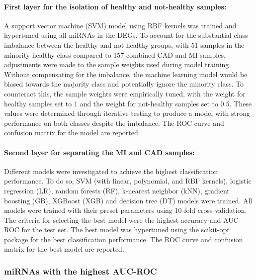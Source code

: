 \documentclass[sn-mathphys,Numbered]{sn-jnl}%
\theoremstyle{thmstyleone}%
\theoremstyle{thmstyletwo}%
\theoremstyle{thmstylethree}%
\begin{document}
\paragraph{First layer for the isolation of healthy and not-healthy
samples:}\label{first-layer-for-the-isolation-of-healthy-and-not-healthy-samples}

A support vector machine (SVM) model using RBF kernels was trained and
hypertuned using all miRNAs in the DEGs. 
To account for the substantial class imbalance between the healthy and not-healthy groups, with 51 samples in the minority healthy class compared to 157 combined CAD and MI samples, adjustments were made to the sample weights used during model training. Without compensating for the imbalance, the machine learning model would be biased towards the majority class and potentially ignore the minority class. To counteract this, the sample weights were empirically tuned, with the weight for healthy samples set to 1 and the weight for not-healthy samples set to 0.5. These values were determined through iterative testing to produce a model with strong performance on both classes despite the imbalance.
The ROC curve
and confusion matrix for the model are reported.


\paragraph{Second layer for separating the MI and CAD
samples:}\label{second-layer-for-separating-the-mi-and-cad-samples}

Different models were investigated to achieve the highest classification
performance. To do so, SVM (with linear, polynomial, and RBF kernels),
logistic regression (LR), random forests (RF), k-nearest neighbor (kNN),
gradient boosting (GB), XGBoost (XGB) and decision tree (DT) models were
trained. All models were trained with their preset parameters using
10-fold cross-validation. The criteria for selecting the best model were
the highest accuracy and AUC-ROC for the test set. The best model was
hypertuned using the scikit-opt package \cite{scikitopt} for the best
classification performance. The ROC curve and confusion matrix for the
best model are reported.


\subsubsection{miRNAs with the highest
AUC-ROC}\label{mirnas-with-the-highest-auc-roc}
\end{document}
